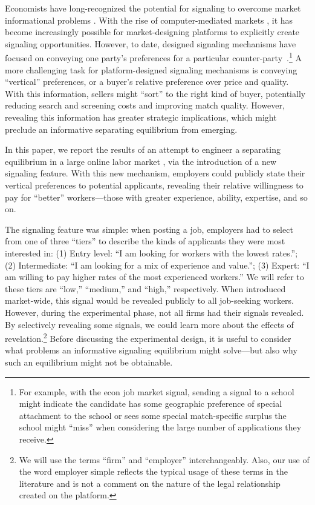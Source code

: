 Economists have long-recognized the potential for signaling to overcome market informational problems \citep{spence1973job, crawford1982strategic}. 
With the rise of computer-mediated markets \citep{varian2010computer}, it has become increasingly possible for market-designing platforms to explicitly create signaling opportunities.
However, to date, designed signaling mechanisms have focused on conveying one party's preferences for a particular counter-party~\citep{lee2011propose, coles2013preference}.\footnote{
  For example, with the econ job market signal, sending a signal to a school might indicate the candidate has some geographic preference of special attachment to the school or sees some special match-specific surplus the school might ``miss'' when considering the large number of applications they receive.
}
A more challenging task for platform-designed signaling mechanisms is conveying ``vertical'' preferences, or a buyer's relative preference over price and quality.
With this information, sellers might ``sort'' to the right kind of buyer, potentially reducing search and screening costs and improving match quality. 
However, revealing this information has greater strategic implications, which might preclude an informative separating equilibrium from emerging.

In this paper, we report the results of an attempt to engineer a separating equilibrium in a large online labor market \citep{Horton2010}, via the introduction of a new signaling feature.
With this new mechanism, employers could publicly state their vertical preferences to potential applicants, revealing their relative willingness to pay for ``better'' workers---those with greater experience, ability, expertise, and so on.

The signaling feature was simple: when posting a job, employers had to select from one of three ``tiers'' to describe the kinds of applicants they were most interested in:
(1) Entry level: ``I am looking for workers with the lowest rates.'';
(2) Intermediate: ``I am looking for a mix of experience and value.'';
(3) Expert: ``I am willing to pay higher rates of the most experienced workers.''
We will refer to these tiers are ``low,'' ``medium,'' and ``high,'' respectively.
When introduced market-wide, this signal would be revealed publicly to all job-seeking workers. 
However, during the experimental phase, not all firms had their signals revealed.
By selectively revealing some signals, we could learn more about the effects of revelation.\footnote{
  We will use the terms ``firm'' and ``employer'' interchangeably. Also, our use of the word employer simple reflects the typical usage of these terms in the literature and is not a comment on the nature of the legal relationship created on the platform. 
} 
Before discussing the experimental design, it is useful to consider what problems an informative signaling equilibrium might solve---but also why such an equilibrium might not be obtainable.

